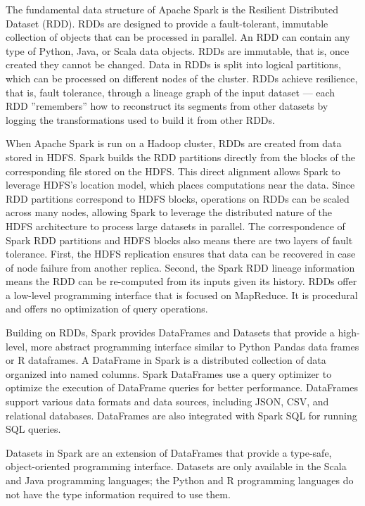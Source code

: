 The fundamental data structure of Apache Spark is the Resilient Distributed Dataset (RDD). RDDs are designed to provide a fault-tolerant, immutable collection of objects that can be processed in parallel. An RDD can contain any type of Python, Java, or Scala data objects. RDDs are immutable, that is, once created they cannot be changed. Data in RDDs is split into logical partitions, which can be processed on different nodes of the cluster. RDDs achieve resilience, that is, fault tolerance, through a lineage graph of the input dataset --- each RDD ''remembers'' how to reconstruct its segments from other datasets by logging the transformations used to build it from other RDDs.

When Apache Spark is run on a Hadoop cluster, RDDs are created from data stored in HDFS. Spark builds the RDD partitions directly from the blocks of the corresponding file stored on the HDFS. This direct alignment allows Spark to leverage HDFS's location model, which places computations near the data. Since RDD partitions correspond to HDFS blocks, operations on RDDs can be scaled across many nodes, allowing Spark to leverage the distributed nature of the HDFS architecture to process large datasets in parallel. The correspondence of Spark RDD partitions and HDFS blocks also means there are two layers of fault tolerance. First, the HDFS replication ensures that data can be recovered in case of node failure from another replica. Second, the Spark RDD lineage information means the RDD can be re-computed from its inputs given its history. RDDs offer a low-level programming interface that is focused on MapReduce. It is procedural and offers no optimization of query operations. 

Building on RDDs, Spark provides DataFrames and Datasets  that provide a high-level, more abstract programming interface similar to Python Pandas data frames or R dataframes. A DataFrame in Spark is a distributed collection of data organized into named columns. Spark DataFrames use a query optimizer to optimize the execution of DataFrame queries for better performance. DataFrames support various data formats and data sources, including JSON, CSV, and relational databases. DataFrames are also integrated with Spark SQL for running SQL queries.

Datasets in Spark are an extension of DataFrames that provide a type-safe, object-oriented programming interface. Datasets are only available in the Scala and Java programming languages; the Python and R programming languages do not have the type information required to use them.

